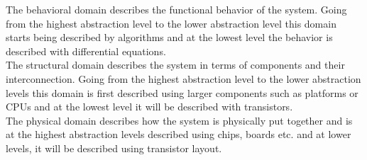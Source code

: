 The behavioral domain describes the functional behavior of the system. Going from the highest abstraction level to the lower abstraction level this domain starts being described by algorithms and at the lowest level the behavior is described with differential equations.\\

The structural domain describes the system in terms of components and their interconnection. Going from the highest abstraction level to the lower abstraction levels this domain is first described using larger components such as platforms or CPUs and at the lowest level it will be described with transistors.\\

The physical domain describes how the system is physically put together and is at the highest abstraction levels described using chips, boards etc. and at lower levels, it will be described using transistor layout.\\

